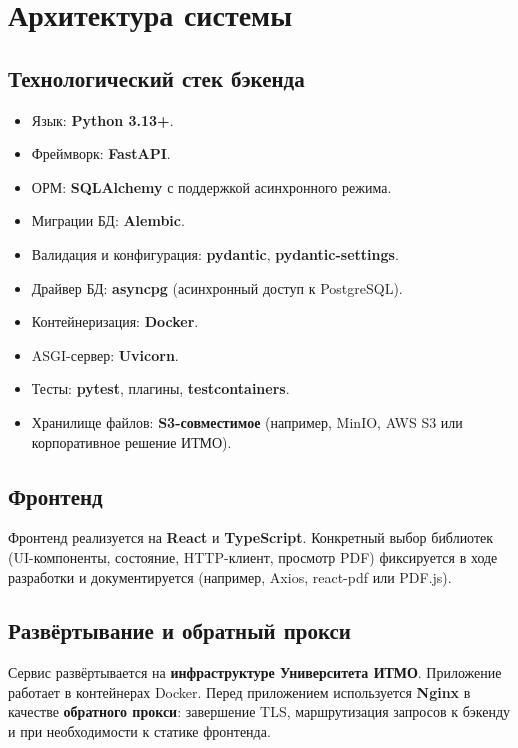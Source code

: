 \section{Архитектура системы}

\subsection{Технологический стек бэкенда}

\begin{itemize}
  \item Язык: \textbf{Python 3.13+}.
  \item Фреймворк: \textbf{FastAPI}.
  \item ОРМ: \textbf{SQLAlchemy} с поддержкой асинхронного режима.
  \item Миграции БД: \textbf{Alembic}.
  \item Валидация и конфигурация: \textbf{pydantic}, \textbf{pydantic-settings}.
  \item Драйвер БД: \textbf{asyncpg} (асинхронный доступ к PostgreSQL).
  \item Контейнеризация: \textbf{Docker}.
  \item ASGI-сервер: \textbf{Uvicorn}.
  \item Тесты: \textbf{pytest}, плагины, \textbf{testcontainers}.
  \item Хранилище файлов: \textbf{S3-совместимое} (например, MinIO, AWS S3 или корпоративное решение ИТМО).
\end{itemize}

\subsection{Фронтенд}

Фронтенд реализуется на \textbf{React} и \textbf{TypeScript}. Конкретный выбор библиотек (UI-компоненты, состояние, HTTP-клиент, просмотр PDF) фиксируется в ходе разработки и документируется (например, Axios, react-pdf или PDF.js).

\subsection{Развёртывание и обратный прокси}

Сервис развёртывается на \textbf{инфраструктуре Университета ИТМО}. Приложение работает в контейнерах Docker. Перед приложением используется \textbf{Nginx} в качестве \textbf{обратного прокси}: завершение TLS, маршрутизация запросов к бэкенду и при необходимости к статике фронтенда.

